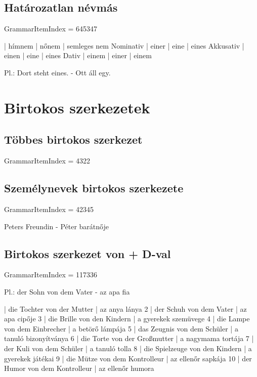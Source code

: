 \documentclass{article}
\newenvironment{desc}{\verbatim}{\endverbatim}
\newenvironment{exmp}{\verbatim}{\endverbatim}
\begin{document}
\subsection{Határozatlan névmás}

GrammarItemIndex = 645347

\begin{desc}
          | hímnem | nőnem | semleges nem 
Nominativ | einer  | eine  | eines 
Akkusativ | einen  | eine  | eines 
Dativ     | einem  | einer | einem 

Pl.: Dort steht eines. - Ott áll egy.
\end{desc}

\section{Birtokos szerkezetek}

\subsection{Többes birtokos szerkezet}

GrammarItemIndex = 4322

\subsection{Személynevek birtokos szerkezete}

GrammarItemIndex = 42345

\begin{desc}
Peters Freundin - Péter barátnője
\end{desc}

\subsection{Birtokos szerkezet von + D-val}

GrammarItemIndex = 117336

\begin{desc}
Pl.: der Sohn von dem Vater - az apa fia
\end{desc}

\begin{exmp}
1 | die Tochter von der Mutter | az anya lánya
2 | der Schuh von dem Vater | az apa cipője
3 | die Brille von den Kindern | a gyerekek szemüvege
4 | die Lampe von dem Einbrecher | a betörő lámpája
5 | das Zeugnis von dem Schüler | a tanuló bizonyítványa
6 | die Torte von der Großmutter | a nagymama tortája
7 | der Kuli von dem Schüler | a tanuló tolla
8 | die Spielzeuge von den Kindern | a gyerekek játékai
9 | die Mütze von dem Kontrolleur | az ellenőr sapkája
10 | der Humor von dem Kontrolleur | az ellenőr humora
\end{exmp}
\end{document}
